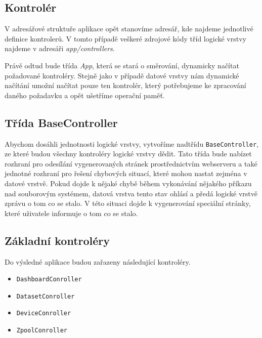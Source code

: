     \subsection{Kontrolér}
    V adresářové struktuře aplikace opět stanovíme adresář, kde najdeme jednotlivé definice kontrolerů. V tomto případě veškeré zdrojové kódy tříd logické vrstvy najdeme v adresáři \emph{app/controllers}.
    \begin{figure}
      \centering
    \end{figure}


    Právě odtud bude třída \emph{App}, která se stará o směrování, dynamicky načítat požadované kontroléry. Stejně jako v případě datové vrstvy nám dynamické načítání umožní načítat pouze ten kontrolér, který potřebujeme ke zpracování daného požadavku a opět ušetříme operační paměť.

    \subsection{Třída BaseController}
    Abychom dosáhli jednotnosti logické vrstvy, vytvoříme nadtřídu \verb|BaseController|, ze které budou všechny kontroléry logické vrstvy dědit. Tato třída bude nabízet rozhraní pro odesílání vygenerovaných stránek prostřednictvím webserveru a také jednotné rozhraní pro řešení chybových situací, které mohou nastat zejména v datové vrstvě. Pokud dojde k nějaké chybě během vykonávání nějakého příkazu nad souborovým systémem, datová vrstva tento stav ohlásí a předá logické vrstvě zprávu o tom co se stalo. V této situaci dojde k vygenerování speciální stránky, které uživatele informuje o tom co se stalo.
    \subsection{Základní kontroléry}
    Do výsledné aplikace budou zařazeny následující kontroléry.
    \begin{itemize}
      \item \verb|DashboardConroller|
      \item \verb|DatasetConroller|
      \item \verb|DeviceConroller|
      \item \verb|ZpoolConroller|
    \end{itemize}

